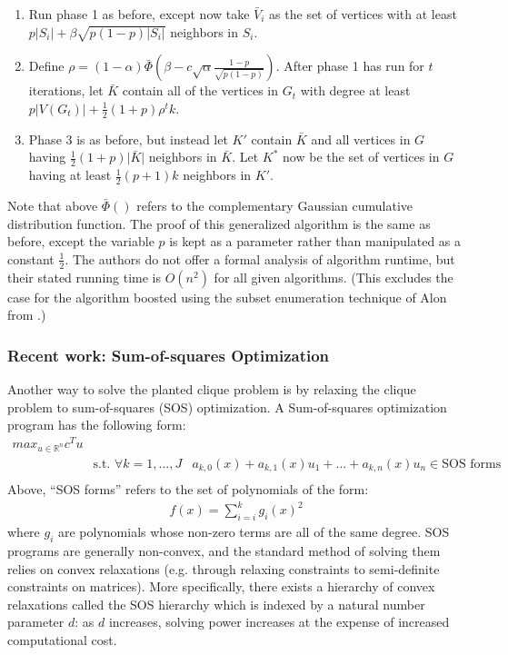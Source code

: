 \documentclass{article}
\theoremstyle{definition}
\begin{document}
\begin{enumerate}
\item{Run phase 1 as before, except now take 
$\bar{V}_i$ as the set of vertices with at least 
$p\lvert S_i \rvert + \beta \sqrt{p(1-p)\lvert S_i \rvert}$ 
neighbors in $S_i$.}
\item{Define 
$\rho=(1-\alpha)\bar{\Phi}(\beta-c\sqrt{\alpha}\frac{1-p}{\sqrt{p(1-p)}})$.  After phase 1 has run for $t$ iterations, let 
$\bar{K}$ contain all of the vertices in $G_t$ with degree 
at least $p\lvert V(G_t)\rvert + \frac{1}{2}(1+p)\rho^tk$.}
\item{Phase 3 is as before, but instead let $K'$ contain $\bar{K}$ 
and all vertices in $G$ having $\frac{1}{2}(1+p)\lvert \bar{K} \rvert$
neighbors in $\bar{K}$.  Let $K^*$ now be the set of vertices 
in $G$ having at least $\frac{1}{2}(p+1)k$ neighbors in $K'$.}
\end{enumerate}

\noindent Note that above $\bar{\Phi}()$ refers to the complementary Gaussian cumulative distribution function. The proof of this generalized algorithm is the same as before, except the variable $p$ is kept as a parameter rather than manipulated as a constant $\frac{1}{2}$.  The authors do not offer a 
formal analysis of algorithm runtime, but their stated running time is 
$O(n^2)$ for all given algorithms.  (This excludes the case for the 
algorithm boosted using the subset enumeration technique of Alon from 
\cite{Spectral}.)

\subsubsection{Recent work: Sum-of-squares Optimization}

Another way to solve the planted clique problem is by relaxing the clique problem to sum-of-squares (SOS) optimization. A Sum-of-squares optimization program has the following form: \newline
\begin{align*}
max_{u \in \mathbb{R}^n} c^Tu & \\
& \text{s.t. } \forall k = 1, ..., J & a_{k,0}(x) + a_{k,1}(x)u_1 + ... + a_{k,n}(x)u_n \in \text{SOS forms}\\
\end{align*}
Above, ``SOS forms'' refers to the set of polynomials of the form: 
\begin{align*}
	f(x) = \sum_{i=i}^{k} g_i(x)^2 
\end{align*}
\noindent where $g_i$ are polynomials whose non-zero terms are all of the same degree. 
SOS programs are generally non-convex, and the standard method of solving them relies on 
convex relaxations (e.g. through relaxing constraints to semi-definite constraints on 
matrices). More specifically, there exists a hierarchy of convex relaxations called the
SOS hierarchy which is indexed by a natural number parameter $d$: as $d$ increases, 
solving power increases at the expense of increased computational cost. 
\end{document}
